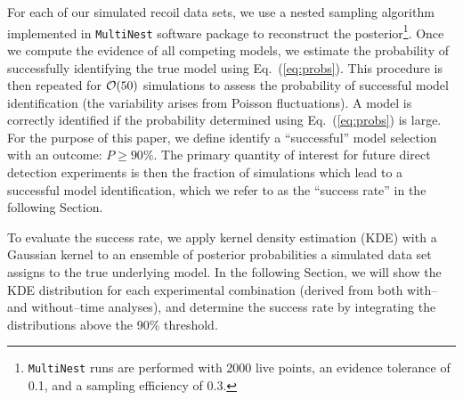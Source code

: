 \documentclass[11pt, a4paper]{article}
\newcommand{\Eq}[1]{Eq.~(\ref{#1})} \newcommand{\Eqs}[2]{Eqs.~(\ref{#1}) and (\ref{#2})} \newcommand{\Eqm}[2]{Eqs.~(\ref{#1}) through (\ref{#2})}
\begin{document}
For each of our simulated recoil data sets, we use a nested sampling algorithm implemented in \texttt{MultiNest} software package \cite{pymultinest,Feroz:2008xx,Feroz:2007kg,Feroz:2013hea} to reconstruct the posterior\footnote{\texttt{MultiNest} runs are performed with 2000 live points, an evidence tolerance of 0.1, and a sampling efficiency of 0.3.}. Once we compute the evidence of all competing models, we estimate the probability of successfully identifying the true model using \Eq{eq:probs}. This procedure is then repeated for ${\cal O}(50)$ simulations to assess the probability of successful model identification (the variability arises from Poisson fluctuations). A model is correctly identified if the probability determined using \Eq{eq:probs} is large. For the purpose of this paper, we define identify a ``successful'' model selection with an outcome: $P \geq 90\%$. The primary quantity of interest for future direct detection experiments is then the fraction of simulations which lead to a successful model identification, which we refer to as the ``success rate'' in the following Section.    

To evaluate the success rate, we apply kernel density estimation (KDE) with a Gaussian kernel to an ensemble of posterior probabilities a simulated data set assigns to the true underlying model. In the following Section, we will show the KDE distribution for each experimental combination (derived from both with-- and without--time analyses), and determine the success rate by integrating the distributions above the 90\% threshold. 
\end{document}
